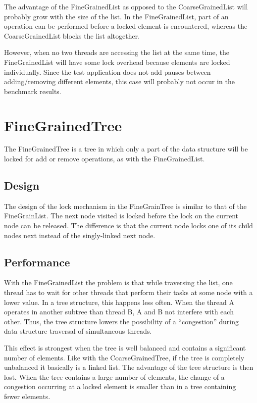\documentclass[a4paper]{article}
\begin{document}
The advantage of the FineGrainedList as opposed to the CoarseGrainedList will
probably grow with the size of the list. In the FineGrainedList, part of an
operation can be performed before a locked element is encountered, whereas the
CoarseGrainedList blocks the list altogether.

However, when no two threads are accessing the list at the same time, the
FineGrainedList will have some lock overhead because elements are locked
individually. Since the test application does not add pauses between
adding/removing different elements, this case will probably not occur in the
benchmark results.

\section{FineGrainedTree}

The FineGrainedTree is a tree in which only a part of the data structure
will be locked for add or remove operations, as with the FineGrainedList.

\subsection{Design}

The design of the lock mechanism in the FineGrainTree is similar to that of the
FineGrainList. The next node visited is locked before the lock on the current
node can be released. The difference is that the current node locks one of its
child nodes next instead of the singly-linked next node.

\subsection{Performance}

With the FineGrainedList the problem is that while traversing the list, one thread has to
wait for other threads that perform their tasks at some node with a lower value. In a tree
structure, this happens less often. When the thread A operates in another subtree than
thread B, A and B not interfere with each other. Thus, the tree structure lowers the
possibility of a ``congestion'' during data structure traversal of simultaneous threads.

This effect is strongest when the tree is well balanced and contains a significant number
of elements. Like with the CoarseGrainedTree, if the tree is completely unbalanced it
basically is a linked list. The advantage of the tree structure is then lost. When the
tree contains a large number of elements, the change of a congestion occurring at a locked
element is smaller than in a tree containing fewer elements.
\end{document}
